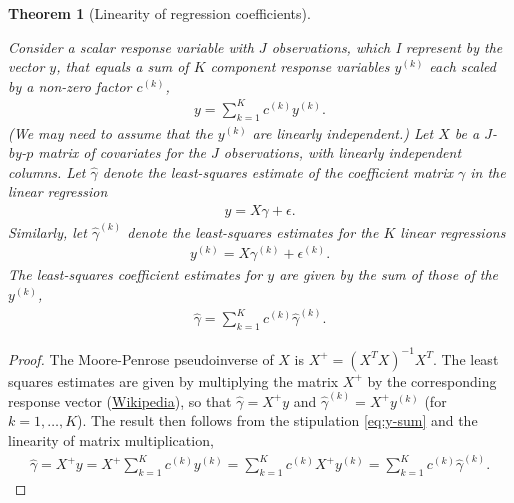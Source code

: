 \documentclass[
]{article}
\newtheorem{theorem}{Theorem}[section]
\theoremstyle{definition}
\theoremstyle{definition}
\theoremstyle{definition}
\theoremstyle{definition}
\theoremstyle{remark}
\begin{document}
\begin{theorem}[Linearity of regression coefficients]
\protect\hypertarget{thm:regression-linearity}{}\label{thm:regression-linearity}

Consider a scalar response variable with \(J\) observations, which I represent by the vector \(y\), that equals a sum of \(K\) component response variables \(y^{(k)}\) each scaled by a non-zero factor \(c^{(k)}\),
\begin{align}
  \label{eq:y-sum}
  y = \sum_{k = 1}^K c^{(k)} y^{(k)}.
\end{align}
(We may need to assume that the \(y^{(k)}\) are linearly independent.)
Let \(X\) be a \(J\)-by-\(p\) matrix of covariates for the \(J\) observations, with linearly independent columns.
Let \(\hat \gamma\) denote the least-squares estimate of the coefficient matrix \(\gamma\) in the linear regression
\begin{align}
  y = X \gamma + \epsilon.
\end{align}
Similarly, let \(\hat \gamma^{(k)}\) denote the least-squares estimates for the \(K\) linear regressions
\begin{align}
  y^{(k)} = X \gamma^{(k)} + \epsilon^{(k)}.
\end{align}
The least-squares coefficient estimates for \(y\) are given by the sum of those of the \(y^{(k)}\),
\begin{align}
  \hat \gamma = \sum_{k=1}^K c^{(k)} \hat \gamma^{(k)}.
\end{align}

\end{theorem}

\begin{proof}

The Moore-Penrose pseudoinverse of \(X\) is \(X^+ = (X^T X)^{-1} X^T\).
The least squares estimates are given by multiplying the matrix \(X^+\) by the corresponding response vector (\href{https://en.wikipedia.org/wiki/Ordinary_least_squares\#Matrix/vector_formulation}{Wikipedia}), so that \(\hat \gamma = X^+ y\) and \(\hat \gamma^{(k)} = X^+ y^{(k)}\) (for \(k = 1, \dots, K\)).
The result then follows from the stipulation \eqref{eq:y-sum} and the linearity of matrix multiplication,
\begin{align}
  \hat \gamma 
  = X^+ y 
  = X^+ \sum_{k = 1}^K c^{(k)} y^{(k)}
  = \sum_{k = 1}^K c^{(k)} X^+ y^{(k)}
  = \sum_{k = 1}^K c^{(k)} \hat \gamma^{(k)}.
\end{align}

\end{proof}
\end{document}
